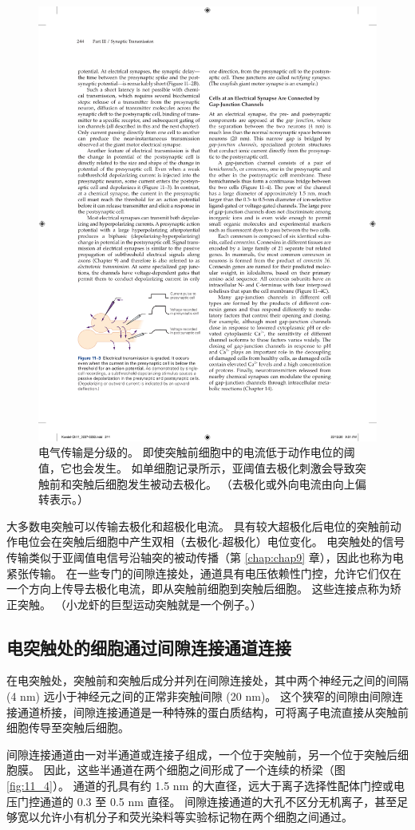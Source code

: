 \begin{figure}[htbp]
	\centering
	\includegraphics[width=0.5\linewidth]{chap11/fig_11_3}
	\caption{电气传输是分级的。 即使突触前细胞中的电流低于动作电位的阈值，它也会发生。 如单细胞记录所示，亚阈值去极化刺激会导致突触前和突触后细胞发生被动去极化。 （去极化或外向电流由向上偏转表示。）}
	\label{fig:11_3}
\end{figure}


大多数电突触可以传输去极化和超极化电流。 
具有较大超极化后电位的突触前动作电位会在突触后细胞中产生双相（去极化-超极化）电位变化。 
电突触处的信号传输类似于亚阈值电信号沿轴突的被动传播（第 \ref{chap:chap9} 章），因此也称为电紧张传输。 
在一些专门的间隙连接处，通道具有电压依赖性门控，允许它们仅在一个方向上传导去极化电流，即从突触前细胞到突触后细胞。 
这些连接点称为矫正突触。 （小龙虾的巨型运动突触就是一个例子。）


\subsection{电突触处的细胞通过间隙连接通道连接}
在电突触处，突触前和突触后成分并列在间隙连接处，其中两个神经元之间的间隔 (4 nm) 远小于神经元之间的正常非突触间隙 (20 nm)。 
这个狭窄的间隙由间隙连接通道桥接，间隙连接通道是一种特殊的蛋白质结构，可将离子电流直接从突触前细胞传导至突触后细胞。


间隙连接通道由一对半通道或连接子组成，一个位于突触前，另一个位于突触后细胞膜。 
因此，这些半通道在两个细胞之间形成了一个连续的桥梁（图 \ref{fig:11_4}）。 
通道的孔具有约 1.5 nm 的大直径，远大于离子选择性配体门控或电压门控通道的 0.3 至 0.5 nm 直径。 
间隙连接通道的大孔不区分无机离子，甚至足够宽以允许小有机分子和荧光染料等实验标记物在两个细胞之间通过。

